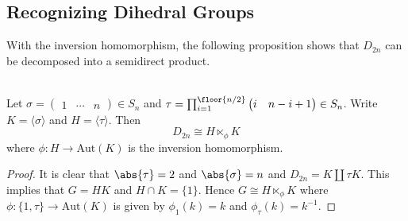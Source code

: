 \documentclass[a4paper]{article}
\begin{document}
\subsection{Recognizing Dihedral Groups}
With the inversion homomorphism, the following proposition shows that $D_{2n}$ can be decomposed into a semidirect product. 

\begin{prp}{}{}\\
Let $\sigma=\begin{pmatrix}1 & \cdots &  n\end{pmatrix}\in S_n$ and $\tau=\prod_{i=1}^{\floor{n/2}}\begin{pmatrix}i & n-i+1\end{pmatrix}\in S_n$. Write $K=\langle\sigma\rangle$ and $H=\langle\tau\rangle$. Then $$D_{2n}\cong H\ltimes_\phi K$$ where $\phi:H\to\text{Aut}(K)$ is the inversion homomorphism. 
\begin{proof}
It is clear that $\abs{\tau}=2$ and $\abs{\sigma}=n$ and $D_{2n}=K\amalg\tau K$. This implies that $G=HK$ and $H\cap K=\{1\}$. Hence $G\cong H\ltimes_\phi K$ where $\phi:\{1,\tau\}\to\text{Aut}(K)$ is given by $\phi_1(k)=k$ and $\phi_{\tau}(k)=k^{-1}$. 
\end{proof}
\end{prp}
\end{document}

